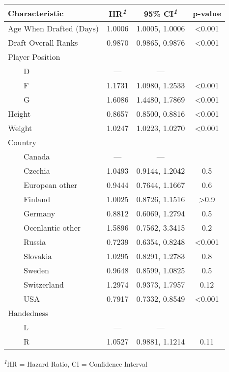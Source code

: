 \setlength{\LTpost}{0mm}
\begin{longtable}{lccc}
\toprule
\textbf{Characteristic} & \textbf{HR}\textsuperscript{\textit{1}} & \textbf{95\% CI}\textsuperscript{\textit{1}} & \textbf{p-value} \\ 
\midrule\addlinespace[2.5pt]
Age When Drafted (Days) & 1.0006 & 1.0005, 1.0006 & <0.001 \\ 
Draft Overall Ranks & 0.9870 & 0.9865, 0.9876 & <0.001 \\ 
Player Position &  &  &  \\ 
    D & — & — &  \\ 
    F & 1.1731 & 1.0980, 1.2533 & <0.001 \\ 
    G & 1.6086 & 1.4480, 1.7869 & <0.001 \\ 
Height & 0.8657 & 0.8500, 0.8816 & <0.001 \\ 
Weight & 1.0247 & 1.0223, 1.0270 & <0.001 \\ 
Country &  &  &  \\ 
    Canada & — & — &  \\ 
    Czechia & 1.0493 & 0.9144, 1.2042 & 0.5 \\ 
    European other & 0.9444 & 0.7644, 1.1667 & 0.6 \\ 
    Finland & 1.0025 & 0.8726, 1.1516 & >0.9 \\ 
    Germany & 0.8812 & 0.6069, 1.2794 & 0.5 \\ 
    Ocenlantic other & 1.5896 & 0.7562, 3.3415 & 0.2 \\ 
    Russia & 0.7239 & 0.6354, 0.8248 & <0.001 \\ 
    Slovakia & 1.0295 & 0.8291, 1.2783 & 0.8 \\ 
    Sweden & 0.9648 & 0.8599, 1.0825 & 0.5 \\ 
    Switzerland & 1.2974 & 0.9373, 1.7957 & 0.12 \\ 
    USA & 0.7917 & 0.7332, 0.8549 & <0.001 \\ 
Handedness &  &  &  \\ 
    L & — & — &  \\ 
    R & 1.0527 & 0.9881, 1.1214 & 0.11 \\ 
\bottomrule
\end{longtable}
\begin{minipage}{\linewidth}
\textsuperscript{\textit{1}}HR = Hazard Ratio, CI = Confidence Interval\\
\end{minipage}

